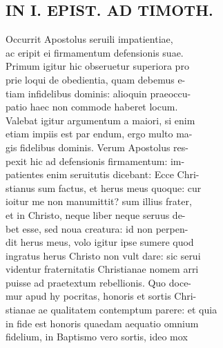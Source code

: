 \documentclass{article}
\begin{document}
\begin{pages}
\section*{IN I. EPIST. AD TIMOTH. \\
                }
Occurrit Apostolus seruili impatientiae, \\
                ac eripit ei firmamentum defensionis suae. \\
                Primum igitur hic obseruetur superiora pro \\
                prie loqui de obedientia, quam debemus e- \\
                tiam infidelibus dominis: alioquin praeoccu- \\
                patio haec non commode haberet locum. \\
                Valebat igitur argumentum a maiori, si enim \\
                etiam impiis est par endum, ergo multo ma- \\
                gis fidelibus dominis. Verum Apostolus res- \\
                pexit hic ad defensionis firmamentum: im- \\
                patientes enim seruitutis dicebant: Ecce Chri- \\
                stianus sum factus, et herus meus quoque: cur \\
                ioitur me non manumittit? sum illius frater, \\
                et in Christo, neque liber neque seruus de- \\
                bet esse, sed noua creatura: id non perpen- \\
                dit herus meus, volo igitur ipse sumere quod \\
                ingratus herus Christo non vult dare: sic serui \\
                videntur fraternitatis Christianae nomem arri \\
                puisse ad praetextum rebellionis. Quo doce- \\
                mur apud hy pocritas, honoris et sortis Chri- \\
                stianae ae qualitatem contemptum parere: et quia \\
                in fide est honoris quaedam aequatio omnium \\
                fidelium, in Baptismo vero sortis, ideo mox \\

\end{pages}
\end{document}
